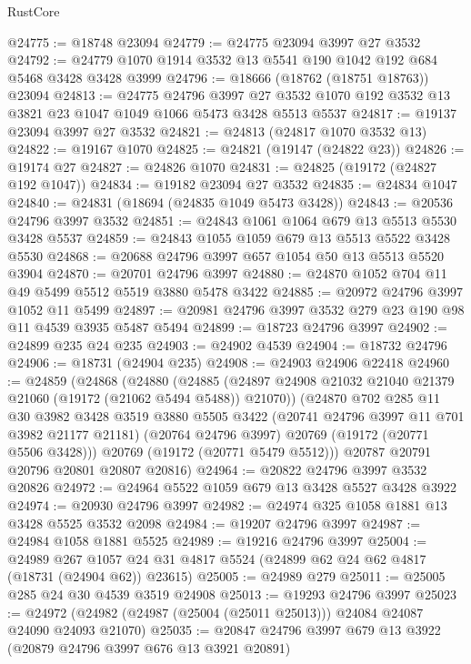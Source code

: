 \begin{lexlean}{RustCore}
\begin{coremodule}
@24775 := @18748 @23094
@24779 := @24775 @23094 @3997 @27 @3532
@24792 := @24779 @1070 @1914 @3532 @13 @5541 @190 @1042 @192 @684 @5468 @3428 @3428 @3999
@24796 := @18666 (@18762 (@18751 @18763)) @23094
@24813 := @24775
    @24796
    @3997
    @27
    @3532
    @1070
    @192
    @3532
    @13
    @3821
    @23
    @1047
    @1049
    @1066
    @5473
    @3428
    @5513
    @5537
@24817 := @19137 @23094 @3997 @27 @3532
@24821 := @24813 (@24817 @1070 @3532 @13)
@24822 := @19167 @1070
@24825 := @24821 (@19147 (@24822 @23))
@24826 := @19174 @27
@24827 := @24826 @1070
@24831 := @24825 (@19172 (@24827 @192 @1047))
@24834 := @19182 @23094 @27 @3532
@24835 := @24834 @1047
@24840 := @24831 (@18694 (@24835 @1049 @5473 @3428))
@24843 := @20536 @24796 @3997 @3532
@24851 := @24843 @1061 @1064 @679 @13 @5513 @5530 @3428 @5537
@24859 := @24843 @1055 @1059 @679 @13 @5513 @5522 @3428 @5530
@24868 := @20688 @24796 @3997 @657 @1054 @50 @13 @5513 @5520 @3904
@24870 := @20701 @24796 @3997
@24880 := @24870 @1052 @704 @11 @49 @5499 @5512 @5519 @3880 @5478 @3422
@24885 := @20972 @24796 @3997 @1052 @11 @5499
@24897 := @20981 @24796 @3997 @3532 @279 @23 @190 @98 @11 @4539 @3935 @5487 @5494
@24899 := @18723 @24796 @3997
@24902 := @24899 @235 @24 @235
@24903 := @24902 @4539
@24904 := @18732 @24796
@24906 := @18731 (@24904 @235)
@24908 := @24903 @24906 @22418
@24960 := @24859
    (@24868
      (@24880
        (@24885 (@24897 @24908 @21032 @21040 @21379 @21060 (@19172 (@21062 @5494 @5488)) @21070))
        (@24870
          @702
          @285
          @11
          @30
          @3982
          @3428
          @3519
          @3880
          @5505
          @3422
          (@20741 @24796 @3997 @11 @701 @3982 @21177 @21181)
          (@20764 @24796 @3997)
          @20769
          (@19172 (@20771 @5506 @3428)))
        @20769
        (@19172 (@20771 @5479 @5512)))
      @20787
      @20791
      @20796
      @20801
      @20807
      @20816)
@24964 := @20822 @24796 @3997 @3532 @20826
@24972 := @24964 @5522 @1059 @679 @13 @3428 @5527 @3428 @3922
@24974 := @20930 @24796 @3997
@24982 := @24974 @325 @1058 @1881 @13 @3428 @5525 @3532 @2098
@24984 := @19207 @24796 @3997
@24987 := @24984 @1058 @1881 @5525
@24989 := @19216 @24796 @3997
@25004 := @24989
    @267
    @1057
    @24
    @31
    @4817
    @5524
    (@24899 @62 @24 @62 @4817 (@18731 (@24904 @62)) @23615)
@25005 := @24989 @279
@25011 := @25005 @285 @24 @30 @4539 @3519 @24908
@25013 := @19293 @24796 @3997
@25023 := @24972 (@24982 (@24987 (@25004 (@25011 @25013))) @24084 @24087 @24090 @24093 @21070)
@25035 := @20847 @24796 @3997 @679 @13 @3922 (@20879 @24796 @3997 @676 @13 @3921 @20891)

\end{coremodule}
\end{lexlean}
